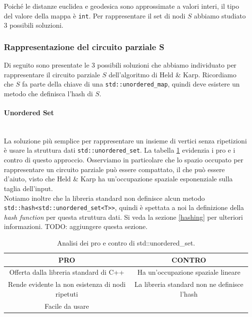 \noindent Poiché le distanze euclidea e geodesica sono approssimate a valori interi, il tipo del valore della mappa è \texttt{int}.
Per rappresentare il set di nodi $S$ abbiamo studiato 3 possibili soluzioni.

\subsubsection{Rappresentazione del circuito parziale S}
\label{held-karp-S-repr}

Di seguito sono presentate le 3 possibili soluzioni che abbiamo individuato per rappresentare il circuito parziale $S$ dell'algoritmo di Held \& Karp. Ricordiamo che $S$ fa parte della chiave di una \texttt{std::unordered_map}, quindi deve esistere un metodo che definisca l'hash di $S$.

\paragraph{Unordered Set}\mbox{}\\

\noindent La soluzione più semplice per rappresentare un insieme di vertici senza ripetizioni è usare la struttura dati \texttt{std::unordered_set}. La tabella \ref{tab:pro-cons-unordered-set} evidenzia i pro e i contro di questo approccio. Osserviamo in particolare che lo spazio occupato per rappresentare un circuito parziale può essere compattato, il che può essere d'aiuto, visto che Held \& Karp ha un'occupazione spaziale esponenziale sulla taglia dell'input. \\

\noindent Notiamo inoltre che la libreria standard non definisce alcun metodo \\ \texttt{std::hash<std::unordered_set<T>>}, quindi è spettata a noi la definizione della \textit{hash function} per questa struttura dati. Si veda la sezione \ref{hashing} per ulteriori informazioni. TODO: aggiungere questa sezione.

\begin{table}
  \centering
    \begin{tabular}{|c | c|}
    \hline
    \textbf{PRO} & \textbf{CONTRO} \\ [0.5ex]
    \hline\hline
    Offerta dalla libreria standard di C++ & Ha un'occupazione spaziale lineare\\
    \hline
    Rende evidente la non esistenza di nodi ripetuti & La libreria standard non ne definisce l'hash \\
    \hline
    Facile da usare &  \\
    \hline
  \end{tabular}
    \caption{Analisi dei pro e contro di std::unordered\_set.}
    \label{tab:pro-cons-unordered-set}
\end{table}


